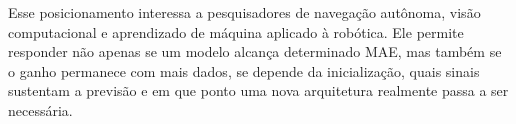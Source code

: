 Esse posicionamento interessa a pesquisadores de navegação autônoma, visão computacional e aprendizado de máquina aplicado à robótica. Ele permite responder não apenas se um modelo alcança determinado MAE, mas também se o ganho permanece com mais dados, se depende da inicialização, quais sinais sustentam a previsão e em que ponto uma nova arquitetura realmente passa a ser necessária.
